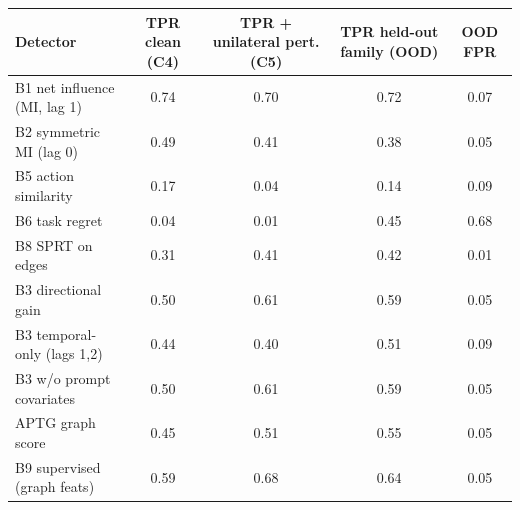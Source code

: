\begin{tabular}{lcccc}
\toprule
Detector & TPR clean (C4) & TPR + unilateral pert. (C5) & TPR held-out family (OOD) & OOD FPR \\
\midrule
B1 net influence (MI, lag 1) & 0.74 & 0.70 & 0.72 & 0.07 \\
B2 symmetric MI (lag 0) & 0.49 & 0.41 & 0.38 & 0.05 \\
B5 action similarity & 0.17 & 0.04 & 0.14 & 0.09 \\
B6 task regret & 0.04 & 0.01 & 0.45 & 0.68 \\
B8 SPRT on edges & 0.31 & 0.41 & 0.42 & 0.01 \\
B3 directional gain & 0.50 & 0.61 & 0.59 & 0.05 \\
B3 temporal-only (lags 1,2) & 0.44 & 0.40 & 0.51 & 0.09 \\
B3 w/o prompt covariates & 0.50 & 0.61 & 0.59 & 0.05 \\
APTG graph score & 0.45 & 0.51 & 0.55 & 0.05 \\
B9 supervised (graph feats) & 0.59 & 0.68 & 0.64 & 0.05 \\
\bottomrule
\end{tabular}